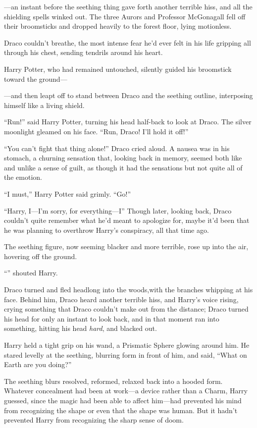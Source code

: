 \begin{em}
—an instant before the seething thing gave forth another terrible hiss, and all the shielding spells winked out. The three Aurors and Professor McGonagall fell off their broomsticks and dropped heavily to the forest floor, lying motionless.

Draco couldn’t breathe, the most intense fear he’d ever felt in his life gripping all through his chest, sending tendrils around his heart.

Harry Potter, who had remained untouched, silently guided his broomstick toward the ground—

—and then leapt off to stand between Draco and the seething outline, interposing himself like a living shield.

“Run!” said Harry Potter, turning his head half-back to look at Draco. The silver moonlight gleamed on his face. “Run, Draco! I’ll hold it off!”

“You can’t fight that thing alone!” Draco cried aloud. A nausea was in his stomach, a churning sensation that, looking back in memory, seemed both like and unlike a sense of guilt, as though it had the sensations but not quite all of the emotion.

“I must,” Harry Potter said grimly. “Go!”

“Harry, I—I’m sorry, for everything—I” Though later, looking back, Draco couldn’t quite remember what he’d meant to apologize for, maybe it’d been that he was planning to overthrow Harry’s conspiracy, all that time ago.

The seething figure, now seeming blacker and more terrible, rose up into the air, hovering off the ground.

“” shouted Harry.

Draco turned and fled headlong into the woods,with the branches whipping at his face. Behind him, Draco heard another terrible hiss, and Harry’s voice rising, crying something that Draco couldn’t make out from the distance; Draco turned his head for only an instant to look back, and in that moment ran into something, hitting his head \emph{hard}, and blacked out.
\end{em}

\later

Harry held a tight grip on his wand, a Prismatic Sphere glowing around him. He stared levelly at the seething, blurring form in front of him, and said, “What on Earth are you doing?”

The seething blurs resolved, reformed, relaxed back into a hooded form. Whatever concealment had been at work—a device rather than a Charm, Harry guessed, since the magic had been able to affect him—had prevented his mind from recognizing the shape or even that the shape was human. But it hadn’t prevented Harry from recognizing the sharp sense of doom.


